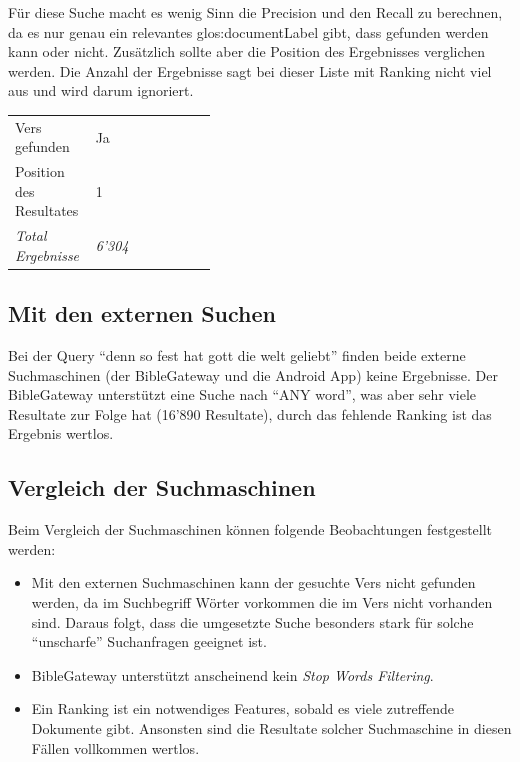 Für diese Suche macht es wenig Sinn die Precision und den Recall zu berechnen, da es nur genau ein relevantes \gls{glos:documentLabel} gibt, dass gefunden werden kann oder nicht.
Zusätzlich sollte aber die Position des Ergebnisses verglichen werden.
Die Anzahl der Ergebnisse sagt bei dieser Liste mit Ranking nicht viel aus und wird darum ignoriert.

\begin{table}[H]
	\centering
	\small\renewcommand{\arraystretch}{1.4}
	\begin{tabularx}{0.6\textwidth}{ L{0.4\linewidth} | X }%
		\hline
		Vers gefunden & Ja\\
		Position des Resultates & 1\\
		\textit{Total Ergebnisse} & \textit{6'304}\\
		\hline
	\end{tabularx}
\end{table}


\subsection{Mit den externen Suchen}
Bei der Query "`denn so fest hat gott die welt geliebt"' finden beide externe Suchmaschinen (der BibleGateway und die Android App) keine Ergebnisse.
Der BibleGateway unterstützt eine Suche nach "`ANY word"', was aber sehr viele Resultate zur Folge hat (16'890 Resultate), durch das fehlende Ranking ist das Ergebnis wertlos.

\subsection{Vergleich der Suchmaschinen}
Beim Vergleich der Suchmaschinen können folgende Beobachtungen festgestellt werden:
\begin{itemize}[noitemsep]
	\item Mit den externen Suchmaschinen kann der gesuchte Vers nicht gefunden werden, da im Suchbegriff Wörter vorkommen die im Vers nicht vorhanden sind.
	Daraus folgt, dass die umgesetzte Suche besonders stark für solche "`unscharfe"' Suchanfragen geeignet ist.
	
	\item BibleGateway unterstützt anscheinend kein \textit{Stop Words Filtering}.
	
	\item Ein Ranking ist ein notwendiges Features, sobald es viele zutreffende Dokumente gibt.
	Ansonsten sind die Resultate solcher Suchmaschine in diesen Fällen vollkommen wertlos.
\end{itemize}

